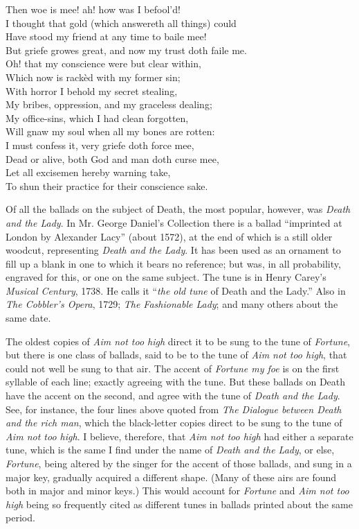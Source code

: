 \begin{dcverse}
Then woe is mee! ah! how was I befool’d!\\
I thought that gold (which answereth all things) could\\
Have stood my friend at any time to baile mee!\\
But griefe growes great, and now my trust doth faile me.\\
Oh! that my conscience were but clear within,\\
Which now is rackèd with my former sin;\\
With horror I behold my secret stealing,\\
My bribes, oppression, and my graceless dealing;\\
My office-sins, which I had clean forgotten,\\
Will gnaw my soul when all my bones are rotten:\\
I must confess it, very griefe doth force mee,\\
Dead or alive, both God and man doth curse mee,\\
Let all excisemen hereby warning take,\\
To shun their practice for their conscience sake.
\end{dcverse}

Of all the ballads on the subject of Death, the most popular, however, was
\textit{Death and the Lady}. In Mr. George Daniel’s Collection there is a ballad
“imprinted at London by Alexander Lacy” (about 1572), at the end of which
is a still older woodcut, representing \textit{Death and the Lady}. It has been used as
an ornament to fill up a blank in one to which it bears no reference; but was, in
all probability, engraved for this, or one \pagebreak on the same subject. The tune is in
Henry Carey’s \textit{Musical Century}, 1738. He calls it “\textit{the old tune} of Death and
the Lady.” Also in \textit{The Cobbler's Opera}, 1729; \textit{The Fashionable Lady}; and
many others about the same date.

The oldest copies of \textit{Aim not too high} direct it to be sung to the tune of \textit{Fortune},
but there is one class of ballads, said to be to the tune of \textit{Aim not too high}, that
could not well be sung to that air. The accent of \textit{Fortune my foe} is on the first
syllable of each line; exactly agreeing with the tune. But these ballads on
Death have the accent on the second, and agree with the tune of \textit{Death and the
Lady}. See, for instance, the four lines above quoted from \textit{The Dialogue between
Death and the rich man}, which the black-letter copies direct to be sung to the
tune of \textit{Aim not too high}. I believe, therefore, that \textit{Aim not too high} had either
a separate tune, which is the same I find under the name of \textit{Death and the Lady},
or else, \textit{Fortune}, being altered by the singer for the accent of those ballads, and
sung in a major key, gradually acquired a different shape. (Many of these airs
are found both in major and minor keys.) This would account for \textit{Fortune} and
\textit{Aim not too high} being so frequently cited as different tunes in ballads printed
about the same period.

